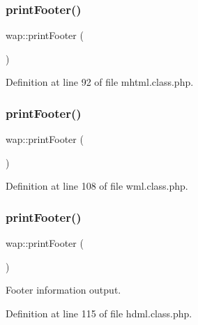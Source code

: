 \subsubsection{\texorpdfstring{print\+Footer()}{printFooter()}\hspace{0.1cm}{\footnotesize\ttfamily [1/3]}}
{\footnotesize\ttfamily wap\+::print\+Footer (\begin{DoxyParamCaption}{ }\end{DoxyParamCaption})}



Definition at line 92 of file mhtml.\+class.\+php.

\hypertarget{classwap_a1fd1c1dca866c9b6653499cabf124980}{}\label{classwap_a1fd1c1dca866c9b6653499cabf124980} 
\subsubsection{\texorpdfstring{print\+Footer()}{printFooter()}\hspace{0.1cm}{\footnotesize\ttfamily [2/3]}}
{\footnotesize\ttfamily wap\+::print\+Footer (\begin{DoxyParamCaption}{ }\end{DoxyParamCaption})}



Definition at line 108 of file wml.\+class.\+php.

\hypertarget{classwap_a1fd1c1dca866c9b6653499cabf124980}{}\label{classwap_a1fd1c1dca866c9b6653499cabf124980} 
\subsubsection{\texorpdfstring{print\+Footer()}{printFooter()}\hspace{0.1cm}{\footnotesize\ttfamily [3/3]}}
{\footnotesize\ttfamily wap\+::print\+Footer (\begin{DoxyParamCaption}{ }\end{DoxyParamCaption})}



Footer information output. 



Definition at line 115 of file hdml.\+class.\+php.

\hypertarget{classwap_a402c6a180ae759c7a173a67441dfb716}{}\label{classwap_a402c6a180ae759c7a173a67441dfb716} 
